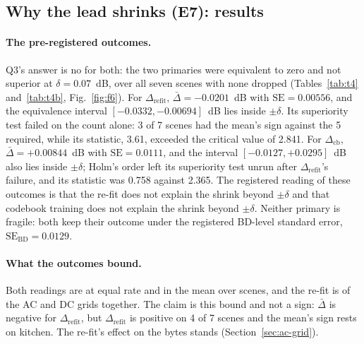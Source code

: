 \subsection{Why the lead shrinks (E7): results}
\label{sec:ft-why-results}

\paragraph{The pre-registered outcomes.}
Q3's answer is no for both: the two primaries were equivalent to zero and not superior at $\delta = 0.07$~dB, over all seven scenes with none dropped (Tables~\ref{tab:t4} and~\ref{tab:t4b}, Fig.~\ref{fig:f6}). %
For $\Delta_{\mathrm{refit}}$, $\bar\Delta = -0.0201$~dB with $\mathrm{SE} = 0.00556$, and the equivalence interval $[-0.0332, -0.00694]$~dB lies inside $\pm\delta$. %
Its superiority test failed on the count alone: 3 of 7 scenes had the mean's sign against the 5 required, while its statistic, 3.61, exceeded the critical value of 2.841. %
For $\Delta_{\mathrm{cb}}$, $\bar\Delta = +0.00844$~dB with $\mathrm{SE} = 0.0111$, and the interval $[-0.0127, +0.0295]$~dB also lies inside $\pm\delta$; Holm's order left its superiority test unrun after $\Delta_{\mathrm{refit}}$'s failure, and its statistic was 0.758 against 2.365. %
The registered reading of these outcomes is that the re-fit does not explain the shrink beyond $\pm\delta$ and that codebook training does not explain the shrink beyond $\pm\delta$. %
Neither primary is fragile: both keep their outcome under the registered BD-level standard error, $\mathrm{SE}_{\mathrm{BD}} = 0.0129$. %

\paragraph{What the outcomes bound.}
Both readings are at equal rate and in the mean over scenes, and the re-fit is of the AC and DC grids together. %
The claim is this bound and not a sign: $\bar\Delta$ is negative for $\Delta_{\mathrm{refit}}$, but $\Delta_{\mathrm{refit}}$ is positive on 4 of 7 scenes and the mean's sign rests on kitchen. %
The re-fit's effect on the bytes stands (Section~\ref{sec:ac-grid}). %

